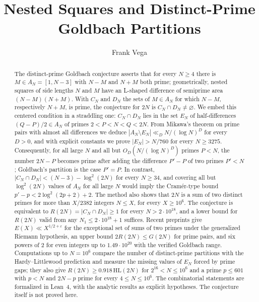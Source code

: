 \documentclass[11pt]{amsart}
\title{Nested Squares and Distinct-Prime Goldbach Partitions}
\author{Frank Vega}
\theoremstyle{definition}
\theoremstyle{remark}
\begin{document}
\begin{abstract}
The distinct-prime Goldbach conjecture asserts that for every $N\geq 4$ there is $M\in A_N=[1,N-3]$ with $N-M$ and $N+M$ both prime; geometrically, nested squares of side lengths $N$ and $M$ have an L-shaped difference of semiprime area $(N-M)(N+M)$. With $C_N$ and $D_N$ the sets of $M\in A_N$ for which $N-M$, respectively $N+M$, is prime, the conjecture for $2N$ is $C_N\cap D_N\neq\varnothing$. We embed this centered condition in a straddling one: $C_N\cap D_N$ lies in the set $E_N$ of half-differences $(Q-P)/2\in A_N$ of primes $2<P<N<Q<2N$. From Mikawa's theorem on prime pairs with almost all differences we deduce $|A_N\setminus E_N|\ll_D N/(\log N)^D$ for every $D>0$, and with explicit constants we prove $|E_N|>N/760$ for every $N\geq 3275$. Consequently, for all large $N$ and all but $O_D(N/(\log N)^D)$ primes $P<N$, the number $2N-P$ becomes prime after adding the difference $P'-P$ of two primes $P'<N$; Goldbach's partition is the case $P'=P$. In contrast, $|C_N\cap D_N|<(N-3)-\log^2(2N)$ for every $N\geq 34$, and covering all but $\log^2(2N)$ values of $A_N$ for all large $N$ would imply the Cram\'er-type bound $p'-p<2\log^2(2p+2)+2$. The method also shows that $2N$ is a sum of two distinct primes for more than $X/2382$ integers $N\leq X$, for every $X\geq 10^6$. The conjecture is equivalent to $R(2N)=|C_N\cap D_N|\geq 1$ for every $N>2\cdot 10^{18}$, and a lower bound for $R(2N)$ valid from any $N_1\leq 2\cdot 10^{18}+1$ suffices. Recent preprints give $E(X)\ll X^{1/2+\varepsilon}$ for the exceptional set of sums of two primes under the generalized Riemann hypothesis, an upper bound $2R(2N)\leq G(2N)$ for prime pairs, and six powers of $2$ for even integers up to $1.49\cdot 10^{20}$ with the verified Goldbach range. Computations up to $N=10^6$ compare the number of distinct-prime partitions with the Hardy--Littlewood prediction and measure the missing values of $E_N$ forced by prime gaps; they also give $R(2N)\geq 0.918\,\mathrm{HL}(2N)$ for $2^{16}<N\leq 10^6$ and a prime $p\leq 601$ with $p<N$ and $2N-p$ prime for every $4\leq N\leq 10^6$. The combinatorial statements are formalized in Lean~4, with the analytic results as explicit hypotheses. The conjecture itself is not proved here.
\end{abstract}

\maketitle
\end{document}
